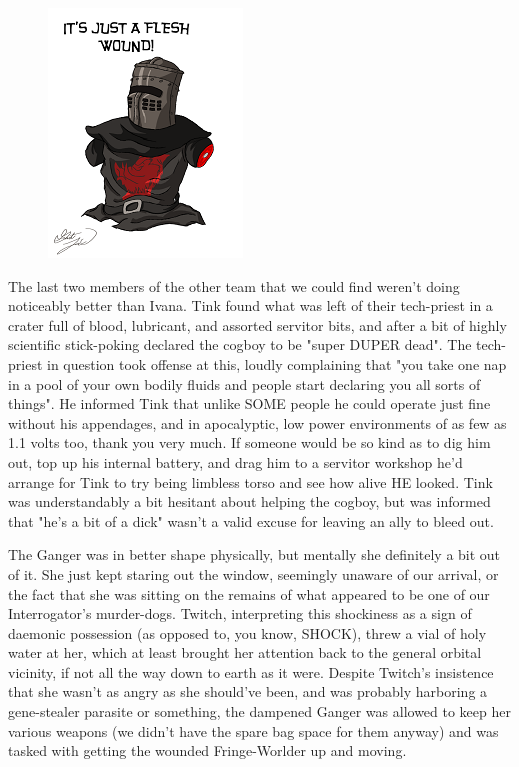 \begin{figure}
	\begin{center}
		\includegraphics[width=\figwidth]{pics/19/3.png}
	\end{center}
\end{figure}
The last two members of the other team that we could find weren't doing noticeably better than Ivana. 
Tink found what was left of their tech-priest in a crater full of blood, lubricant, and assorted servitor bits, and after a bit of highly scientific stick-poking declared the cogboy to be "super DUPER dead". 
The tech-priest in question took offense at this, loudly complaining that "you take one nap in a pool of your own bodily fluids and people start declaring you all sorts of things". 
He informed Tink that unlike SOME people he could operate just fine without his appendages, and in apocalyptic, low power environments of as few as 1.1 volts too, thank you very much. 
If someone would be so kind as to dig him out, top up his internal battery, and drag him to a servitor workshop he'd arrange for Tink to try being limbless torso and see how alive HE looked. 
Tink was understandably a bit hesitant about helping the cogboy, but was informed that "he's a bit of a dick" wasn't a valid excuse for leaving an ally to bleed out.

The Ganger was in better shape physically, but mentally she definitely a bit out of it. 
She just kept staring out the window, seemingly unaware of our arrival, or the fact that she was sitting on the remains of what appeared to be one of our Interrogator's murder-dogs. 
Twitch, interpreting this shockiness as a sign of daemonic possession (as opposed to, you know, SHOCK), threw a vial of holy water at her, which at least brought her attention back to the general orbital vicinity, if not all the way down to earth as it were. 
Despite Twitch's insistence that she wasn't as angry as she should've been, and was probably harboring a gene-stealer parasite or something, the dampened Ganger was allowed to keep her various weapons (we didn't have the spare bag space for them anyway) and was tasked with getting the wounded Fringe-Worlder up and moving.

